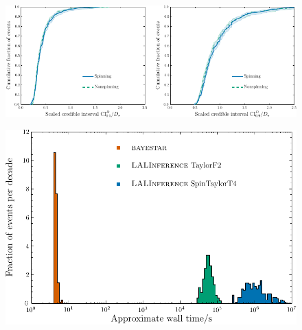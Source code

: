 \documentclass[iop,apj,twocolumn,twocolappendix,numberedappendix]{emulateapj}
\begin{document}






\begin{figure}
  \centering
  \includegraphics[width=1.7\columnwidth]{figures/Fig_spin_dist/Fig_spin_dist}
  \caption{\protect} 
\end{figure}









\begin{figure}
  \centering
  \includegraphics[width=0.95\columnwidth]{figures/Fig_final_time_hist1/Fig_final_time_hist}
  \caption{\protect} 
\end{figure}


 
\end{document}
